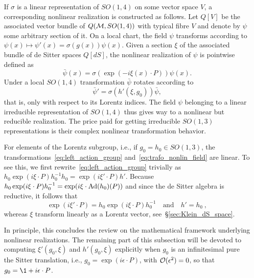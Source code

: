 \documentclass[
final,
11pt,
a4paper,
DIV=11,
headinclude=true,
footinclude=false,
bibliography=totoc,
twoside=true,  %
BCOR=5mm
]{scrbook}
\begin{document}
If $\sigma$ is a linear representation of $SO(1,4)$ on some 
vector space $V$, a corresponding nonlinear realization is 
constructed as follows. Let $Q[V]$ be the associated vector 
bundle of $Q(\mathcal{M}, SO(1,4))$ with typical fibre $V$ and denote 
by $\psi$ some arbitrary section of it.  On a local chart, the 
field $\psi$ transforms according to $\psi(x) \mapsto \psi'(x) 
= \sigma(g(x))\psi(x)$. Given a section $\xi$ of the associated 
bundle of de Sitter spaces $Q[dS]$, the nonlinear realization of 
$\psi$ is pointwise defined as
\begin{equation}
\label{eq:def_nonlinear_field}
  \bar{\psi}(x) = \sigma(\exp(-i\xi(x)\cdot P))\psi(x).
\end{equation}
Under a local $SO(1,4)$ transformation $\bar{\psi}$ rotates 
according to
\begin{equation}
\label{eq:trafo_nonlin_field}
  \bar{\psi}' = \sigma(h'(\xi, g_0)) \bar{\psi},
\end{equation}
that is, only with respect to its Lorentz indices. The field 
$\psi$ belonging to a linear irreducible representation of 
$SO(1,4)$ thus gives way to a nonlinear but reducible 
realization. The price paid for getting irreducible $SO(1,3)$ 
representations is their complex nonlinear transformation 
behavior.

For elements of the Lorentz subgroup, i.e., if $g_0 = h_0 \in 
SO(1,3)$, the transformations~\eqref{eq:left_action_group} 
and~\eqref{eq:trafo_nonlin_field} are linear. To see this, we 
first rewrite~\eqref{eq:left_action_group} trivially as $h_0 
\exp(i\xi\cdot P)h_0^{-1} h_0 = \exp(i\xi'\cdot P)h'$. Because 
$h_0 \exp(i\xi\cdot P) h_0^{-1} = \exp(i \xi \cdot \operatorname{Ad}(h_0)(P))$ 
and since the de Sitter algebra is reductive, it follows that
\begin{equation*}
  \exp(i\xi'\cdot P) = h_0\exp(i\xi\cdot P)h_0^{-1}
  \quad\text{and}\quad
  h' = h_0~,
\end{equation*}
whereas $\xi$ transform linearly as a Lorentz vector, 
see~\S\ref{sec:Klein_dS_space}.

In principle, this concludes the review on the mathematical 
framework underlying nonlinear realizations. The remaining part 
of this subsection will be devoted to computing $\xi'(g_0, \xi)$ 
and $h'(g_0, \xi)$ explicitly when $g_0$ is an infinitesimal 
pure the Sitter translation, i.e., $g_0 = \exp(i\epsilon \cdot 
P)$, with $\mathcal{O}(\epsilon^2) = 0$, so that $g_0 = \1 
+ i \epsilon \cdot P$.
\end{document}
